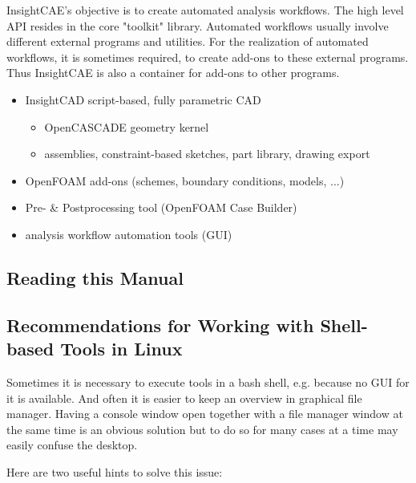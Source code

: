 InsightCAE's objective is to create automated analysis workflows.
The high level API resides in the core "toolkit" library.
Automated workflows usually involve different external programs and utilities.
For the realization of automated workflows, it is sometimes required, to create add-ons to these external programs.
Thus InsightCAE is also a container for add-ons to other programs.

\begin{itemize}
\item InsightCAD script-based, fully parametric CAD

\begin{itemize}
    \item OpenCASCADE geometry kernel
    \item assemblies, constraint-based sketches, part library, drawing export
\end{itemize}

\item OpenFOAM add-ons (schemes, boundary conditions, models, ...)
\item Pre- \& Postprocessing tool (OpenFOAM Case Builder)
\item analysis workflow automation tools (GUI)
\end{itemize}

\subsection{Reading this Manual}


\subsection{Recommendations for Working with Shell-based Tools in Linux}

Sometimes it is necessary to execute tools in a bash shell, e.g. because no GUI for it is available. And often it is easier to keep an overview in graphical file manager.
Having a console window open together with a file manager window at the same time is an obvious solution but to do so for many cases at a time may easily confuse the desktop. 

Here are two useful hints to solve this issue:
 
